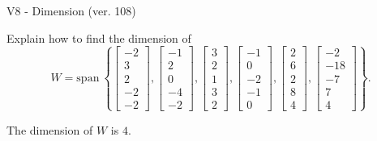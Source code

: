 \begin{exercise}
  \begin{exerciseTitle}V8 - Dimension (ver. 108)\end{exerciseTitle}
  \begin{exerciseStatement}
    Explain how to find the dimension of 
\[W=\mathrm{span}\ \left\{\left[\begin{array}{r}
-2 \\
3 \\
2 \\
-2 \\
-2
\end{array}\right] , \left[\begin{array}{r}
-1 \\
2 \\
0 \\
-4 \\
-2
\end{array}\right] , \left[\begin{array}{r}
3 \\
2 \\
1 \\
3 \\
2
\end{array}\right] , \left[\begin{array}{r}
-1 \\
0 \\
-2 \\
-1 \\
0
\end{array}\right] , \left[\begin{array}{r}
2 \\
6 \\
2 \\
8 \\
4
\end{array}\right] , \left[\begin{array}{r}
-2 \\
-18 \\
-7 \\
7 \\
4
\end{array}\right]\right\}.\]



  \end{exerciseStatement}
  \begin{exerciseAnswer}
   The dimension of \(W\) is  \(4\).
  


  \end{exerciseAnswer}
\end{exercise}